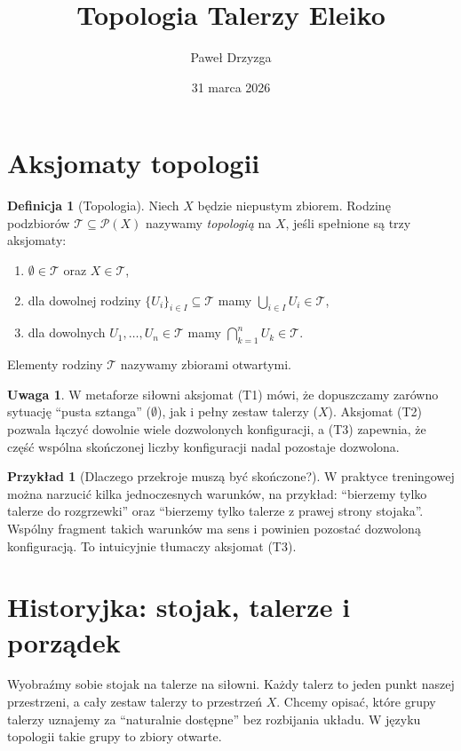 \documentclass[10pt,a4paper]{article}
\title{Topologia Talerzy Eleiko}
\author{Paweł Drzyzga}
\date{31 marca 2026}
\theoremstyle{plain}
\theoremstyle{definition}
\newtheorem{df}[tw]{Definicja}
\newtheorem{uw}[tw]{Uwaga}
\newtheorem{prz}[tw]{Przykład}
\begin{document}
\maketitle

\section{Aksjomaty topologii}

\begin{df}[Topologia]
Niech $X$ będzie niepustym zbiorem. Rodzinę podzbiorów $\mathcal{T} \subseteq \mathcal{P}(X)$
nazywamy \emph{topologią} na $X$, jeśli spełnione są trzy aksjomaty:
\begin{enumerate}[label=(T\arabic*)]
    \item $\emptyset \in \mathcal{T}$ oraz $X \in \mathcal{T}$,
    \item dla dowolnej rodziny $\{U_i\}_{i \in I} \subseteq \mathcal{T}$ mamy
    $\bigcup_{i \in I} U_i \in \mathcal{T}$,
    \item dla dowolnych $U_1,\dots,U_n \in \mathcal{T}$ mamy
    $\bigcap_{k=1}^{n} U_k \in \mathcal{T}$.
\end{enumerate}
Elementy rodziny $\mathcal{T}$ nazywamy zbiorami otwartymi.
\end{df}

\begin{uw}
W metaforze siłowni aksjomat (T1) mówi, że dopuszczamy zarówno sytuację ``pusta sztanga''
($\emptyset$), jak i pełny zestaw talerzy ($X$). Aksjomat (T2) pozwala łączyć dowolnie wiele
dozwolonych konfiguracji, a (T3) zapewnia, że część wspólna skończonej liczby konfiguracji
nadal pozostaje dozwolona.
\end{uw}

\begin{prz}[Dlaczego przekroje muszą być skończone?]
W praktyce treningowej można narzucić kilka jednoczesnych warunków, na przykład:
``bierzemy tylko talerze do rozgrzewki'' oraz ``bierzemy tylko talerze z prawej strony stojaka''.
Wspólny fragment takich warunków ma sens i powinien pozostać dozwoloną konfiguracją.
To intuicyjnie tłumaczy aksjomat (T3).
\end{prz}

\section{Historyjka: stojak, talerze i porządek}

Wyobraźmy sobie stojak na talerze na siłowni. Każdy talerz to jeden punkt naszej przestrzeni,
a cały zestaw talerzy to przestrzeń $X$. Chcemy opisać, które grupy talerzy uznajemy za
``naturalnie dostępne'' bez rozbijania układu. W języku topologii takie grupy to zbiory otwarte.
\end{document}
